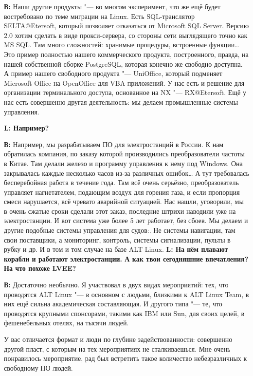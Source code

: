 \documentclass[10pt, a5paper]{article}
\begin{document}
{\noindent \bf В:} Наши другие продукты "--- во многом эксперимент, что же ещё будет востребовано по теме миграции на Linux. Есть SQL-транслятор SELTA@Etersoft, который позволяет отказаться от Microsoft SQL Server. Версию 2.0 хотим сделать в виде прокси-сервера, со стороны сети выглядящего точно как MS SQL. Там много сложностей: хранимые процедуры, встроенные функции\ldots Это пример полностью нашего коммерческого продукта, построенного, правда, на нашей собственной сборке PostgreSQL, которая конечно же свободно доступна. А пример нашего свободного продукта "--- UniOffice, который  подменяет Microsoft Office на OpenOffice для VBA-приложений. У нас есть и решение для организации терминального доступа, основанное на NX "--- RX@Et\-er\-soft. Ещё у нас есть совершенно другая деятельность: мы делаем промышленные системы управления. 

{\noindent \bf L: Например?}

{\noindent \bf В:} Например, мы разрабатываем ПО для электростанций в России. К нам обратилась компания, по заказу которой производились преобразователи частоты в Китае. Там делали железо и программу управления к нему под Windows. Она закрывалась каждые несколько часов из-за различных ошибок… А тут требовалась бесперебойная работа в течение года. Там всё очень серьёзно, преобразователь управляет нагнетателем, подающим воздух для горения газа, и если пропорция смеси нарушается, всё чревато аварийной ситуацией. Нас нашли, уговорили, мы в очень сжатые сроки сделали этот заказ, последние штрихи наводили уже на электростанции. И вот система уже более 5 лет работает, без сбоев. Мы делаем и другие подобные системы управления для судов:. Не системы навигации, там свои поставщики, а мониторинг, контроль, системы сигнализации, пульты в рубку и др. И в том и том случае на базе ALT Linux. 
\longpage
{\noindent \bf L: На нём плавают корабли и работают электростанции. А как твои сегодняшние впечатления? На что похоже LVEE?}

{\noindent \bf В:} Достаточно необычно. Я участвовал в двух видах мероприятий: тех, что проводятся ALT Linux "--- в основном с людьми, близкими к ALT Linux Team, в них ещё сильна академическая составляющая. И другого типа "--- те, что проводятся крупными спонсорами, такими как IBM или Sun, для своих целей, в фешенебельных отелях,  на тысячи людей.

У вас отличается формат и люди по глубине задействованности: совершенно другой пласт, с которым на тех мероприятиях не сталкиваешься. Мне очень понравилось мероприятие, рад был встретить такое количество небезразличных к свободному ПО людей.
\end{document}

